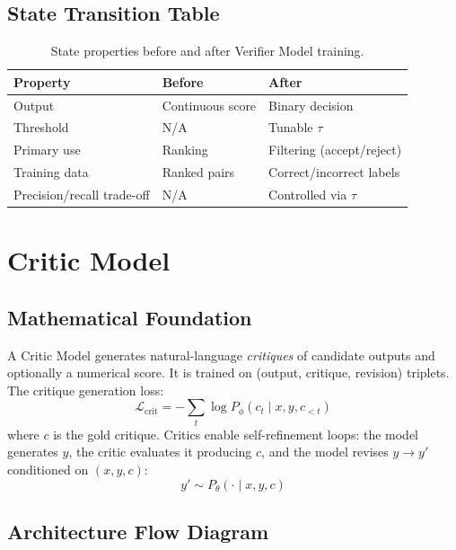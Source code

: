 \documentclass{article}
\begin{document}
\subsection{State Transition Table}
\begin{table}[h]\centering
\begin{tabular}{lll}\toprule
\textbf{Property} & \textbf{Before} & \textbf{After}\\\midrule
Output & Continuous score & Binary decision\\
Threshold & N/A & Tunable $\tau$\\
Primary use & Ranking & Filtering (accept/reject)\\
Training data & Ranked pairs & Correct/incorrect labels\\
Precision/recall trade-off & N/A & Controlled via $\tau$\\\bottomrule
\end{tabular}
\caption{State properties before and after Verifier Model training.}
\end{table}

\newpage
\section{Critic Model}

\subsection{Mathematical Foundation}
A Critic Model generates natural-language \emph{critiques} of candidate outputs and optionally a numerical score. It is trained on (output, critique, revision) triplets. The critique generation loss:
\begin{equation}
  \mathcal{L}_{\text{crit}} = -\sum_t \log P_\phi(c_t \mid x, y, c_{<t})
\end{equation}
where $c$ is the gold critique. Critics enable self-refinement loops: the model generates $y$, the critic evaluates it producing $c$, and the model revises $y \to y'$ conditioned on $(x, y, c)$:
\begin{equation}
  y' \sim P_\theta(\cdot \mid x, y, c)
\end{equation}

\subsection{Architecture Flow Diagram}
\end{document}
